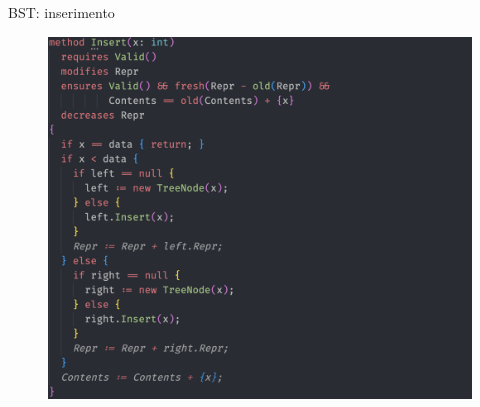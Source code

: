 \documentclass{beamer}
\begin{document}
\begin{frame}{BST: inserimento}
    \begin{figure}
        \includegraphics[scale=0.4]{./assets/images/screenshots/insert.png}
    \end{figure}
\end{frame}
\end{document}
